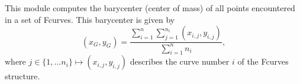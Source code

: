 This module computes the barycenter 
(center of mass) 
of all points encountered in a set
of Fcurves. This barycenter is given by
$$(x_G,y_G) = 
\frac{\displaystyle \sum_{i=1}^n \sum_{j=1}^{n_i} (x_{i,j},y_{i,j})}
{\displaystyle \sum_{i=1}^n n_i},$$
where $j \in \{1,\ldots n_i\} \mapsto (x_{i,j},y_{i,j})$ describes
the curve number $i$ of the Fcurves structure.